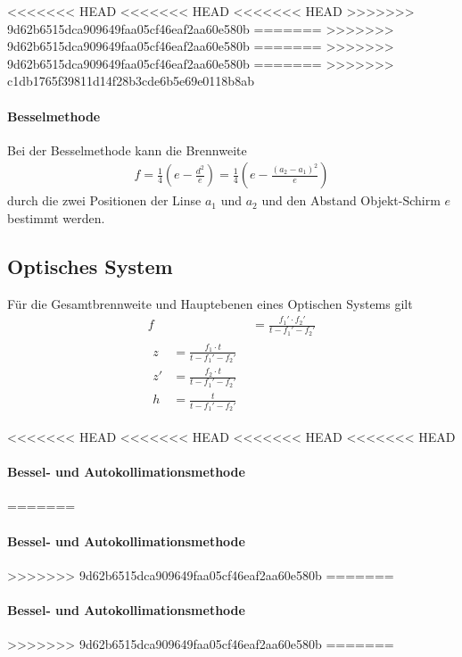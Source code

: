 \documentclass[11pt, a4paper]{article}
\begin{document}
<<<<<<< HEAD
<<<<<<< HEAD
<<<<<<< HEAD
>>>>>>> 9d62b6515dca909649faa05cf46eaf2aa60e580b
=======
>>>>>>> 9d62b6515dca909649faa05cf46eaf2aa60e580b
=======
>>>>>>> 9d62b6515dca909649faa05cf46eaf2aa60e580b
=======
>>>>>>> c1db1765f39811d14f28b3cde6b5e69e0118b8ab
    \paragraph{Besselmethode}
    Bei der Besselmethode kann die Brennweite
    \begin{align}
        f = \frac{1}{4} \left( e - \frac{d^2}{e} \right) = \frac{1}{4} \left( e - \frac{\left(a_2 - a_1\right)^2}{e} \right) \label{eq:bessel}
    \end{align}
    durch die zwei Positionen der Linse $a_1$ und $a_2$ und den Abstand Objekt-Schirm $e$ bestimmt werden.
    
    \subsection{Optisches System}

    Für die Gesamtbrennweite und Hauptebenen eines Optischen Systems gilt
    \begin{align}
        f &= \frac{f_1' \cdot f_2'}{t - f_1' - f_2'} \label{eq:brenn}\\ 
        \begin{split} \label{eq:ebene}
           z &= \frac{f_1 \cdot t}{t - f_1' - f_2'}  \\
           z' &= \frac{f_2 \cdot t}{t - f_1' - f_2'} \\
           h &= \frac{t}{t - f_1' - f_2'}
        \end{split}
    \end{align}

<<<<<<< HEAD
<<<<<<< HEAD
<<<<<<< HEAD
<<<<<<< HEAD
    \paragraph*{Bessel- und Autokollimationsmethode}
=======
    \paragraph{Bessel- und Autokollimationsmethode}
>>>>>>> 9d62b6515dca909649faa05cf46eaf2aa60e580b
=======
    \paragraph{Bessel- und Autokollimationsmethode}
>>>>>>> 9d62b6515dca909649faa05cf46eaf2aa60e580b
=======
\end{document}
